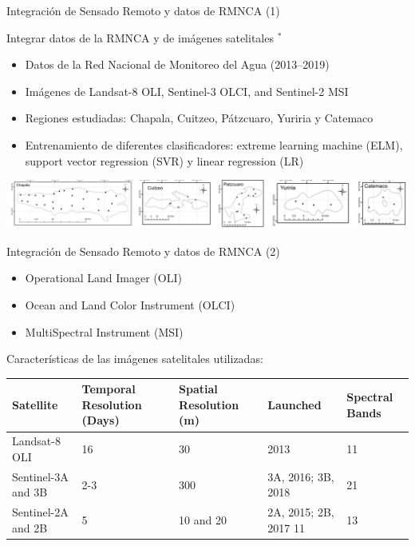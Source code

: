 \documentclass[aspectratio=169,compress]{beamer}
\begin{document}

\begin{frame}{Integración de Sensado Remoto y datos de RMNCA (1)}

Integrar datos de la RMNCA y de imágenes satelitales \cite{s21124118}$^*$
\begin{itemize}
\item Datos de la Red Nacional de Monitoreo del Agua (2013–2019) 
\item Imágenes de Landsat-8 OLI, Sentinel-3 OLCI, and Sentinel-2 MSI 
\item Regiones estudiadas: Chapala, Cuitzeo, Pátzcuaro, Yuriria y Catemaco
\item Entrenamiento de diferentes clasificadores: extreme learning machine (ELM), support vector regression (SVR) y linear regression (LR)
\end{itemize}
\begin{center}
\includegraphics[width=1.00\linewidth]{figs/LagosMexico.png}\\
\end{center}


\end{frame}


\begin{frame}{Integración de Sensado Remoto y datos de RMNCA (2)}
\begin{itemize}
\item Operational Land Imager (OLI)
\item Ocean and Land Color Instrument (OLCI)
\item MultiSpectral Instrument (MSI)
\end{itemize}
Características de las imágenes satelitales utilizadas:
\begin{center}
\begin{tabular}{p{2.5cm}p{2.25cm}p{2.25cm}p{2.25cm}p{2.25cm}}
\hline
\hline
Satellite & Temporal Resolution (Days) & Spatial Resolution (m) & Launched & Spectral Bands \\
\hline
\hline
Landsat-8 OLI & 16 & 30 & 2013 & 11 \\ \hline
Sentinel-3A and 3B & 2-3 & 300 & 3A, 2016; 3B, 2018 & 21 \\ \hline
Sentinel-2A and 2B & 5 & 10 and 20 & 2A, 2015; 2B, 2017 11 & 13 \\
\hline
\hline
\end{tabular}
\end{center}


\end{frame}
\end{document}
